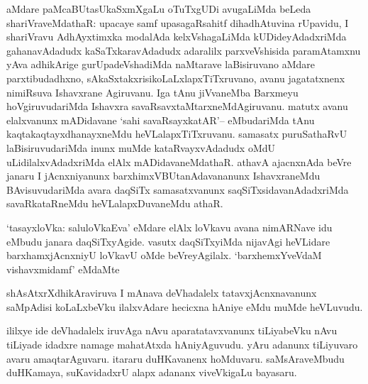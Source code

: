 \begin{artha}
aMdare paMcaBUtasUkaSxmXgaLu oTuTxgUDi avugaLiMda beLeda shariVraveMdathaR: upacaye samf upasagaRsahitf dihadhAtuvina rUpavidu, I shariVravu AdhAyxtimxka modalAda kelxVshagaLiMda kUDideyAdadxriMda gahanavAdadudx kaSaTxkaravAdadudx adaralilx parxveVshisida paramAtamxnu yAva adhikArige gurUpadeVshadiMda naMtarave laBisiruvano aMdare parxtibudadhxno, sAkaSxtakxrisikoLaLxlapxTiTxruvano, avanu  jagatatxnenx nimiRsuva Ishavxrane Agiruvanu. Iga tAnu jiVvaneMba Barxmeyu hoVgiruvudariMda Ishavxra savaRsavxtaMtarxneMdAgiruvanu. matutx avanu elalxvanunx mADidavane `sahi savaRsayxkatAR'-- eMbudariMda tAnu kaqtakaqtayxdhanayxneMdu heVLalapxTiTxruvanu. samasatx puruSathaRvU laBisiruvudariMda inunx muMde kataRvayxvAdadudx oMdU uLidilalxvAdadxriMda elAlx mADidavaneMdathaR. athavA ajacnxnAda beVre janaru I jAcnxniyanunx barxhimxVBUtanAdavananunx IshavxraneMdu BAvisuvudariMda avara daqSiTx samasatxvanunx saqSiTxsidavanAdadxriMda savaRkataRneMdu heVLalapxDuvaneMdu athaR.
\end{artha}

\begin{artha}
  `tasayxloVka: saluloVkaEva' eMdare elAlx loVkavu avana nimARNave idu eMbudu janara daqSiTxyAgide. vasutx daqSiTxyiMda nijavAgi heVLidare barxhamxjAcnxniyU loVkavU oMde beVreyAgilalx. `barxhemxYveVdaM vishavxmidamf' eMdaMte
\end{artha}

\begin{artha}
  shAsAtxrXdhikAraviruva I mAnava deVhadalelx tatavxjAcnxnavanunx saMpAdisi koLaLxbeVku ilalxvAdare hecicxna hAniye eMdu muMde heVLuvudu.
\end{artha}

\begin{artha}
  ililxye ide deVhadalelx iruvAga nAvu aparatatavxvanunx tiLiyabeVku nAvu tiLiyade idadxre namage mahatAtxda hAniyAguvudu. yAru adanunx tiLiyuvaro avaru amaqtarAguvaru. itararu duHKavanenx hoMduvaru. saMsAraveMbudu duHKamaya, suKavidadxrU alapx adananx viveVkigaLu bayasaru.
\end{artha}


